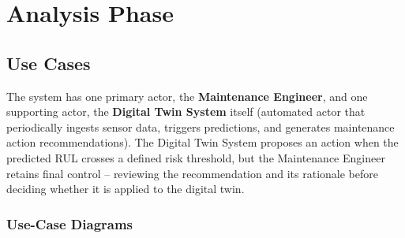 \documentclass[12pt,a4paper]{report}
\begin{document}
\chapter{Analysis Phase}
\section{Use Cases}
The system has one primary actor, the \textbf{Maintenance Engineer}, and one supporting actor, the \textbf{Digital Twin System} itself (automated actor that periodically ingests sensor data, triggers predictions, and generates maintenance action recommendations). The Digital Twin System proposes an action when the predicted RUL crosses a defined risk threshold, but the Maintenance Engineer retains final control -- reviewing the recommendation and its rationale before deciding whether it is applied to the digital twin.

\subsection{Use-Case Diagrams}
\label{sec:usecasediagram}
\end{document}
